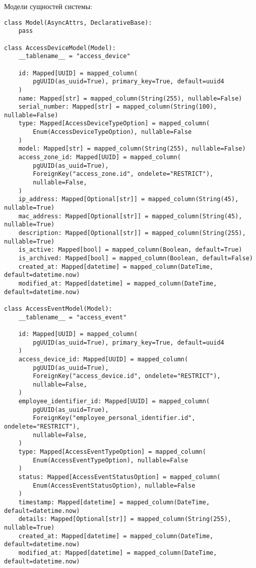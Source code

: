 \noindent
Модели сущностей системы:

\begin{lstlisting}[style=pythonstyle]
class Model(AsyncAttrs, DeclarativeBase):
    pass

class AccessDeviceModel(Model):
    __tablename__ = "access_device"

    id: Mapped[UUID] = mapped_column(
        pgUUID(as_uuid=True), primary_key=True, default=uuid4
    )
    name: Mapped[str] = mapped_column(String(255), nullable=False)
    serial_number: Mapped[str] = mapped_column(String(100), nullable=False)
    type: Mapped[AccessDeviceTypeOption] = mapped_column(
        Enum(AccessDeviceTypeOption), nullable=False
    )
    model: Mapped[str] = mapped_column(String(255), nullable=False)
    access_zone_id: Mapped[UUID] = mapped_column(
        pgUUID(as_uuid=True),
        ForeignKey("access_zone.id", ondelete="RESTRICT"),
        nullable=False,
    )
    ip_address: Mapped[Optional[str]] = mapped_column(String(45), nullable=True)
    mac_address: Mapped[Optional[str]] = mapped_column(String(45), nullable=True)
    description: Mapped[Optional[str]] = mapped_column(String(255), nullable=True)
    is_active: Mapped[bool] = mapped_column(Boolean, default=True)
    is_archived: Mapped[bool] = mapped_column(Boolean, default=False)
    created_at: Mapped[datetime] = mapped_column(DateTime, default=datetime.now)
    modified_at: Mapped[datetime] = mapped_column(DateTime, default=datetime.now)

class AccessEventModel(Model):
    __tablename__ = "access_event"

    id: Mapped[UUID] = mapped_column(
        pgUUID(as_uuid=True), primary_key=True, default=uuid4
    )
    access_device_id: Mapped[UUID] = mapped_column(
        pgUUID(as_uuid=True),
        ForeignKey("access_device.id", ondelete="RESTRICT"),
        nullable=False,
    )
    employee_identifier_id: Mapped[UUID] = mapped_column(
        pgUUID(as_uuid=True),
        ForeignKey("employee_personal_identifier.id", ondelete="RESTRICT"),
        nullable=False,
    )
    type: Mapped[AccessEventTypeOption] = mapped_column(
        Enum(AccessEventTypeOption), nullable=False
    )
    status: Mapped[AccessEventStatusOption] = mapped_column(
        Enum(AccessEventStatusOption), nullable=False
    )
    timestamp: Mapped[datetime] = mapped_column(DateTime, default=datetime.now)
    details: Mapped[Optional[str]] = mapped_column(String(255), nullable=True)
    created_at: Mapped[datetime] = mapped_column(DateTime, default=datetime.now)
    modified_at: Mapped[datetime] = mapped_column(DateTime, default=datetime.now)


\end{lstlisting}
